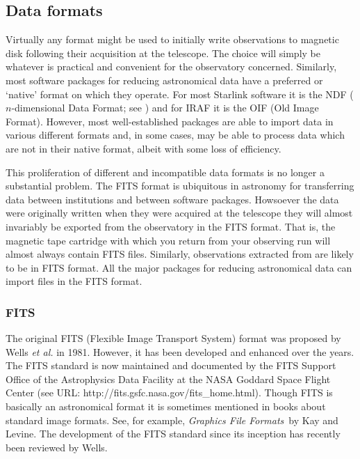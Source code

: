 \documentclass[twoside,11pt]{starlink}
\begin{document}
\subsection{\label{FORMAT}Data formats}

Virtually any format might be used to initially write observations to
magnetic disk following their acquisition at the telescope.  The choice
will simply be whatever is practical and convenient for the observatory
concerned.  Similarly, most software packages for reducing astronomical
data have a preferred or `native' format on which they operate.  For most
Starlink software it is the NDF ($n$-dimensional Data Format; see
\cite{SUN33}) and for IRAF it is the OIF (Old
Image Format).  However, most well-established packages are able to
import data in various different formats and, in some cases, may be able
to process data which are not in their native format, albeit with some loss
of efficiency.

This proliferation of different and incompatible data formats is no longer
a substantial problem.  The FITS format is ubiquitous in astronomy for
transferring data between institutions and between software packages.
Howsoever the data were originally written when they were acquired at the
telescope they will almost invariably be exported from the observatory in
the FITS format.  That is, the magnetic tape cartridge with which you return
from your observing run will almost always contain FITS files.  Similarly,
observations extracted from
are likely to be in FITS format.  All the major packages for reducing
astronomical data can import files in the FITS format.

\subsubsection{FITS}

The original FITS (Flexible Image Transport System) format was proposed by
Wells \textit{et al.}\/\cite{WELLS81} in 1981.  However, it has been developed
and enhanced over the years.  The FITS standard is now maintained and
documented by the FITS Support Office of the Astrophysics Data Facility at
the NASA Goddard Space Flight Center (see URL:  \newline
{}
{http://fits.gsfc.nasa.gov/fits_home.html}).  Though FITS is
basically an astronomical format it is sometimes mentioned in books about
standard image formats.  See, for example, \textit{Graphics File Formats}\, by
Kay and Levine\cite{KAY95}.  The development of the FITS standard since
its inception has recently been reviewed by Wells\cite{WELLS00}.
\end{document}
